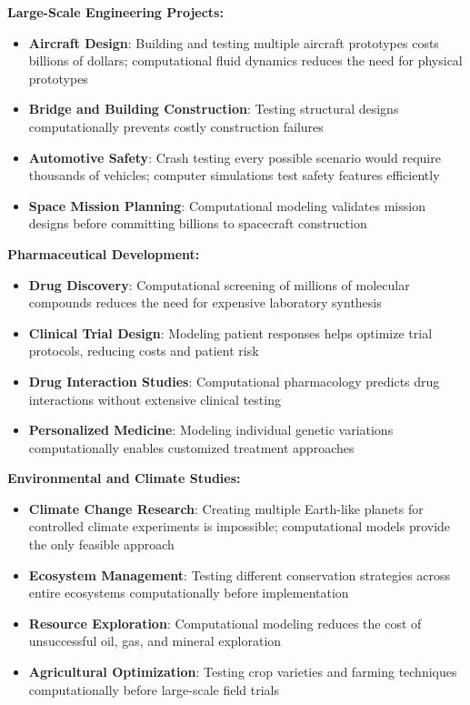 \textbf{Large-Scale Engineering Projects:}
\begin{itemize}
    \item \textbf{Aircraft Design}: Building and testing multiple aircraft prototypes costs billions of dollars; computational fluid dynamics reduces the need for physical prototypes
    \item \textbf{Bridge and Building Construction}: Testing structural designs computationally prevents costly construction failures
    \item \textbf{Automotive Safety}: Crash testing every possible scenario would require thousands of vehicles; computer simulations test safety features efficiently
    \item \textbf{Space Mission Planning}: Computational modeling validates mission designs before committing billions to spacecraft construction
\end{itemize}

\textbf{Pharmaceutical Development:}
\begin{itemize}
    \item \textbf{Drug Discovery}: Computational screening of millions of molecular compounds reduces the need for expensive laboratory synthesis
    \item \textbf{Clinical Trial Design}: Modeling patient responses helps optimize trial protocols, reducing costs and patient risk
    \item \textbf{Drug Interaction Studies}: Computational pharmacology predicts drug interactions without extensive clinical testing
    \item \textbf{Personalized Medicine}: Modeling individual genetic variations computationally enables customized treatment approaches
\end{itemize}

\textbf{Environmental and Climate Studies:}
\begin{itemize}
    \item \textbf{Climate Change Research}: Creating multiple Earth-like planets for controlled climate experiments is impossible; computational models provide the only feasible approach
    \item \textbf{Ecosystem Management}: Testing different conservation strategies across entire ecosystems computationally before implementation
    \item \textbf{Resource Exploration}: Computational modeling reduces the cost of unsuccessful oil, gas, and mineral exploration
    \item \textbf{Agricultural Optimization}: Testing crop varieties and farming techniques computationally before large-scale field trials
\end{itemize}

